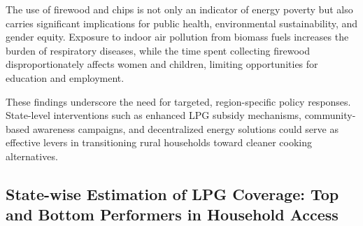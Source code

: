 \documentclass{article}
\begin{document}
The use of firewood and chips is not only an indicator of energy poverty but also carries significant implications for public health, environmental sustainability, and gender equity. Exposure to indoor air pollution from biomass fuels increases the burden of respiratory diseases, while the time spent collecting firewood disproportionately affects women and children, limiting opportunities for education and employment.

These findings underscore the need for targeted, region-specific policy responses. State-level interventions such as enhanced LPG subsidy mechanisms, community-based awareness campaigns, and decentralized energy solutions could serve as effective levers in transitioning rural households toward cleaner cooking alternatives.




\subsection{State-wise Estimation of LPG Coverage: Top and Bottom Performers in Household Access}
\begin{table}[htbp]
	\centering
	\caption{Top and Bottom 5 States by Estimated LPG Coverage Rates}
\end{table}
\end{document}
